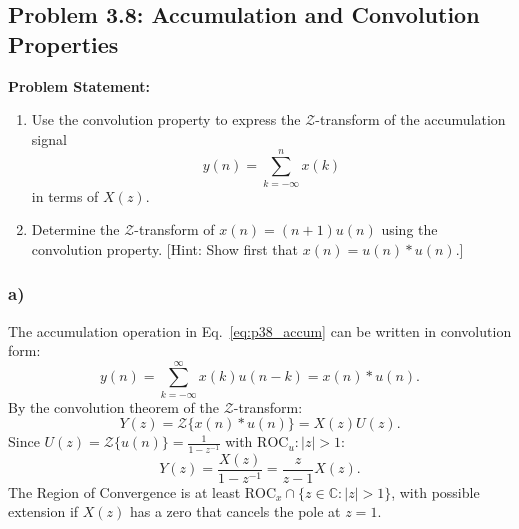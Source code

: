 \documentclass[12pt,a4paper]{article}
\begin{document}
\subsection{Problem 3.8: Accumulation and Convolution Properties}
\textbf{Problem Statement:}
\begin{enumerate}[label=(\alph*)]
    \item Use the convolution property to express the $\mathcal{Z}$-transform of the accumulation signal
    \begin{equation}
        y(n) = \sum_{k=-\infty}^{n} x(k)
        \label{eq:p38_accum}
    \end{equation}
    in terms of $X(z)$.
    \item Determine the $\mathcal{Z}$-transform of $x(n) = (n+1)u(n)$ using the convolution property. [Hint: Show first that $x(n) = u(n) * u(n)$.]
\end{enumerate}

\subsubsection*{a)}
The accumulation operation in Eq.~\eqref{eq:p38_accum} can be written in convolution form:
\begin{equation}
    y(n) = \sum_{k=-\infty}^{\infty} x(k) u(n - k) = x(n) * u(n).
\end{equation}
By the convolution theorem of the $\mathcal{Z}$-transform:
\begin{equation}
    Y(z) = \mathcal{Z}\{x(n) * u(n)\} = X(z) U(z).
\end{equation}
Since $U(z) = \mathcal{Z}\{u(n)\} = \frac{1}{1 - z^{-1}}$ with $\text{ROC}_u: |z| > 1$:
\begin{equation}
    Y(z) = \frac{X(z)}{1 - z^{-1}} = \frac{z}{z - 1} X(z).
\end{equation}
The Region of Convergence is at least $\text{ROC}_x \cap \{z \in \mathbb{C} : |z| > 1\}$, with possible extension if $X(z)$ has a zero that cancels the pole at $z = 1$.
\end{document}
